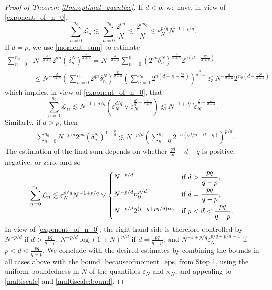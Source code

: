 \documentclass[11pt,reqno]{amsart}
\theoremstyle{definition}
\newcommand{\eps}{\varepsilon}
\newcommand{\mcl}{\mathcal}
\theoremstyle{definition}
\numberwithin{equation}{section}
\numberwithin{lemma}{section}
\numberwithin{proposition}{section}
\numberwithin{theorem}{section}
\numberwithin{corollary}{section}
\numberwithin{definition}{section}
\numberwithin{remark}{section}
\begin{document}
\begin{proof}[Proof of Theorem \ref{thm:optimal_quantize}]
If $d < p$, we have, in view of \eqref{exponent_of_n_0},
\[
	\sum_{n=0}^{n_0} \mcl L_n
	\lesssim \sum_{n=0}^{n_0} \frac{2^{pn}}{N} \lesssim \frac{2^{pn_0}}{N} \lesssim \eps_N^{p/q} N^{-1 + p/q}.
\]
If $d = p$, we use \eqref{moment_sum} to estimate
\begin{align*}
    \sum_{n=0}^{n_0} &N^{-\frac{d}{d+\kappa}} 2^{dn} (\delta_n^N)^{\frac{\kappa}{d + \kappa}}
    = N^{-\frac{d}{d+\kappa}}\sum_{n=0}^{n_0} (2^{qn} \delta_n^N )^{\frac{\kappa}{d+\kappa}} 2^{n\left(d - \frac{q\kappa}{d+\kappa} \right)}\\
    &\le N^{-\frac{d}{d+\kappa}} \left( \sum_{n=0}^{n_0} 2^{qn} \delta_n^N  \right)^{\frac{\kappa}{d+\kappa}}
    \left( \sum_{n=0}^{n_0} 2^{n\left(d + \kappa - \frac{q\kappa}{d} \right) } \right)^{\frac{d}{d +\kappa}} \lesssim N^{-\frac{d}{d+\kappa}} 2^{n_0\left(d - \frac{q\kappa}{d+\kappa} \right)} %
\end{align*}
which implies, in view of \eqref{exponent_of_n_0}, that
\[
    \sum_{n=0}^{n_0} \mcl L_n 
    \lesssim N^{-1 + d/q} \left( \eps_N^{d/q}  \vee \eps_N^{\frac{d}{q} - \frac{\kappa}{d+\kappa}} \right) \lesssim N^{-1 + d/q}\eps_N^{\frac{d}{q} - \frac{\kappa}{d+\kappa}} .
\]
Similarly, if $d > p$, then
\begin{align*}
	& \sum_{n=0}^{n_0} N^{-p/d} 2^{pn} (\delta_n^N)^{1 - \frac{p}{d}}
	\lesssim N^{-p/d} \left(\sum_{n=0}^{n_0} 2^{-n(qd/p - d - q)}\right)^{p/d}.
\end{align*}
The estimation of the final sum depends on whether $\frac{qd}{p} - d - q$ is positive, negative, or zero, and so
\[
	\sum_{n=0}^{n_0} \mcl L_n 
	\lesssim 
    \eps_N^{p/q} N^{-1 + p/q} \vee
	\begin{dcases}
		   N^{-p/d}  & \text{if } d > \frac{pq}{q-p}, \\
        	 N^{-p/d}n_0^{p/d} & \text{if } d = \frac{pq}{q-p},\\
		 N^{-p/d} 2^{(p-q + pq/d)n_0}  
		& \text{if } p < d < \frac{pq}{q-p}. 
	\end{dcases}
\]
In view of \eqref{exponent_of_n_0}, the right-hand-side is therefore controlled by $N^{-p/d}$ if $d > \frac{pq}{q-p}$; $N^{-p/d} \log(1+N)^{p/d}$ if $d = \frac{pq}{q-p}$; and $N^{-1 + p/q}  \eps_N^{p/q + p/d - 1} $ if $p < d < \frac{pq}{q-p}$. We conclude with the desired estimates by combining the bounds in all cases above with the bound \eqref{becauseofmoment_eps} from Step 1, using the uniform boundedness in $N$ of the quantities $\eps_N$ and $\kappa_N$, and appealing to \eqref{multiscale} and \eqref{multiscale:bound}. 


\end{proof}
\end{document}
